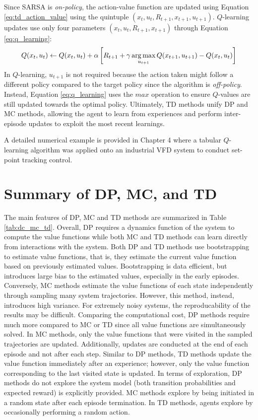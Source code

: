Since SARSA is \textit{on-policy}, the action-value function are updated using Equation \ref{eq:td_action_value} using the quintuple $(x_t, u_t, R_{t+1}, x_{t+1}, u_{t+1})$. $Q$-learning updates use only four parameters $(x_t, u_t, R_{t+1}, x_{t+1})$ through Equation \ref{eq:q_learning}:
\begin{equation}
    Q(x_t, u_t) \leftarrow Q(x_t, u_t) + \alpha \left[R_{t+1} + \gamma \operatorname*{arg\,max}_{u_{t+1}} Q(x_{t+1}, u_{t+1}) - Q(x_t, u_t) \right]
    \label{eq:q_learning}
\end{equation}
In $Q$-learning, $u_{t+1}$ is not required because the action taken might follow a different policy compared to the target policy since the algorithm is \textit{off-policy}. Instead, Equation \ref{eq:q_learning} uses the $max$ operation to ensure $Q$-values are still updated towards the optimal policy. Ultimately, TD methods unify DP and MC methods, allowing the agent to learn from experiences and perform inter-episode updates to exploit the most recent learnings.

A detailed numerical example is provided in Chapter 4 where a tabular $Q$-learning algorithm was applied onto an industrial VFD system to conduct set-point tracking control.



\section{Summary of DP, MC, and TD}
The main features of DP, MC and TD methods are summarized in Table \ref{tab:dc_mc_td}. Overall, DP requires a dynamics function of the system to compute the value functions while both MC and TD methods can learn directly from interactions with the system. Both DP and TD methods use bootstrapping to estimate value functions, that is, they estimate the current value function based on previously estimated values. Bootstrapping is data efficient, but introduces large bias to the estimated values, especially in the early episodes.  Conversely, MC methods estimate the value functions of each state independently through sampling many system trajectories.  However, this method, instead, introduces high variance. For extremely noisy systems, the reproducability of the results may be difficult. Comparing the computational cost, DP methods require much more compared to MC or TD since all value functions are simultaneously solved. In MC methods, only the value functions that were visited in the sampled trajectories are updated.  Additionally, updates are conducted at the end of each episode and not after each step. Similar to DP methods, TD methods update the value function immediately after an experience; however, only the value function corresponding to the last visited state is updated. In terms of exploration, DP methods do not explore the system model (both transition probabilities and expected reward) is explicitly provided. MC methods explore by being initiated in a random state after each episode termination. In TD methods, agents explore by occasionally performing a random action.

